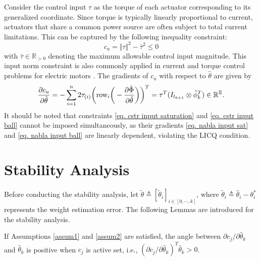 \documentclass[lettersize,journal]{IEEEtran}
\begin{document}
Consider the control input $\tau$ as the torque of each actuator corresponding to its generalized coordinate. Since torque is typically linearly proportional to current, actuators that share a common power source are often subject to total current limitations. This can be captured by the following inequality constraint: 
\begin{equation}
    c_{u}=\Vert\tau\Vert^2 -\bar\tau^2  \le 0
    \label{eq. cstr input ball}
\end{equation}
with $\bar\tau\in\mathbb{R}_{>0}$ denoting the maximum allowable control input magnitude. This input norm constraint is also commonly applied in current and torque control problems for electric motors \cite{RN62}.
The gradients of $c_{u}$ with respect to $\hat\theta$ are given by
\begin{equation}
    {\partial \mathbf \mathbf c_{u} \over \partial \hat\theta}
    = -\sum_{i=1}^n 2\tau_{(i)} 
    \bigg(
        \text{row}_i
        \bigg(
            -{\partial \hat\Phi\over\partial\hat\theta}
        \bigg)
    \bigg)^T  
    = \tau^T (I_{l_{k+1}}\otimes \hat\phi_k^T)
    \in \mathbb R^{\Xi}.
    \label{eq. nabla input ball}
\end{equation}
It should be noted that constraints \eqref{eq. cstr input saturation} and \eqref{eq. cstr input ball} cannot be imposed simultaneously, as their gradients \eqref{eq. nabla input sat} and \eqref{eq. nabla input ball} are linearly dependent, violating the LICQ condition.

\section{Stability Analysis}\label{sec:stability}

Before conducting the stability analysis, let $\tilde\theta\triangleq [\tilde\theta_i]_{i\in[0,\cdots,k]}$, where $\tilde\theta_i\triangleq\hat\theta_i-\theta^*_i$ represents the weight estimation error. The following Lemmas are introduced for the stability analysis. %
\begin{lem}
    If Assumptions \ref{assum1} and \ref{assum2} are satisfied, the angle between $\partial c_j/\partial \hat\theta_k$ and $\hat\theta_k$ is positive when $c_j$ is active set, i.e., $(\partial c_j/\partial \hat\theta_k)^T\hat\theta_k>0$.
    \label{lem1}
\end{lem}
\end{document}
